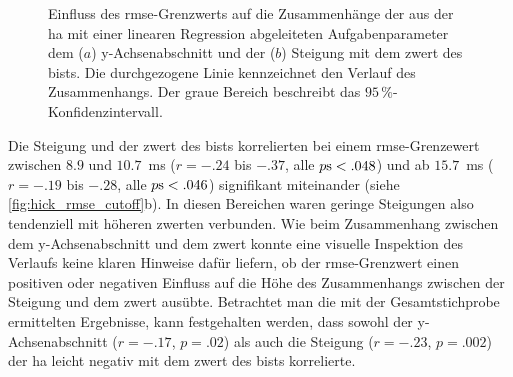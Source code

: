 \documentclass[11pt, twoside, a4paper]{book}		%
\begin{document}
\begin{figure}[htbp]
	\centering
	\begin{adjustbox}{width=1\textwidth}
	\end{adjustbox}
	\newline
	\begin{adjustbox}{width=1\textwidth}
	\end{adjustbox}
	
	\caption[Einfluss des \gls{rmse}-Grenzwerts der \gls{ha} auf den Zusammenhang zwischen dem y-Achsenabschnitt, der Steigung und dem \gls{zwert} des \gls{bist}s]{Einfluss des \gls{rmse}-Grenzwerts auf die Zusammenhänge der aus der \gls{ha} mit einer linearen Regression abgeleiteten Aufgabenparameter dem ($a$) y-Achsenabschnitt und der ($b$) Steigung mit dem \gls{zwert} des \gls{bist}s. Die durchgezogene Linie kennzeichnet den Verlauf des Zusammenhangs. Der graue Bereich beschreibt das $95\,\%$-Konfidenzintervall.}
	\label{fig:hick_rmse_cutoff}
\end{figure}

Die Steigung und der \gls{zwert} des \gls{bist}s korrelierten bei einem \gls{rmse}-Grenzewert zwischen $8.9$ und $10.7$~ms ($r = -.24$ bis $ -.37$, alle $p\textnormal{s} < .048$) und ab $15.7$~ms ($r = -.19$ bis $ -.28$, alle $p\textnormal{s} < .046$) signifikant miteinander (siehe \autoref{fig:hick_rmse_cutoff}b). In diesen Bereichen waren geringe Steigungen also tendenziell mit höheren \gls{zwert}en verbunden. Wie beim Zusammenhang zwischen dem y-Achsenabschnitt und dem \gls{zwert} konnte eine visuelle Inspektion des Verlaufs keine klaren Hinweise dafür liefern, ob der \gls{rmse}-Grenzwert einen positiven oder negativen Einfluss auf die Höhe des Zusammenhangs zwischen der Steigung und dem \gls{zwert} ausübte.
Betrachtet man die mit der Gesamtstichprobe ermittelten Ergebnisse, kann festgehalten werden, dass sowohl der y-Achsenabschnitt ($r=-.17$, $p=.02$) als auch die Steigung ($r=-.23$, $p=.002$) der \gls{ha} leicht negativ mit dem \gls{zwert} des \gls{bist}s korrelierte. %
\end{document}
